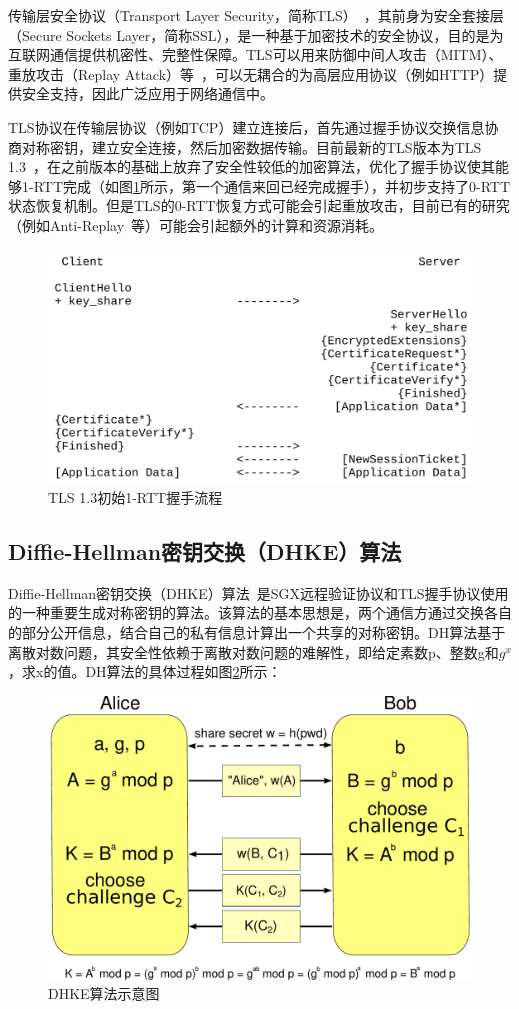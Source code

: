 传输层安全协议（Transport Layer Security，简称TLS）~\cite{8446}，其前身为安全套接层（Secure Sockets Layer，简称SSL），是一种基于加密技术的安全协议，目的是为互联网通信提供机密性、完整性保障。TLS可以用来防御中间人攻击（MITM）、重放攻击（Replay Attack）等~\cite{8446}，可以无耦合的为高层应用协议（例如HTTP）提供安全支持，因此广泛应用于网络通信中。

TLS协议在传输层协议（例如TCP）建立连接后，首先通过握手协议交换信息协商对称密钥，建立安全连接，然后加密数据传输。目前最新的TLS版本为TLS 1.3~\cite{8446}，在之前版本的基础上放弃了安全性较低的加密算法，优化了握手协议使其能够1-RTT完成（如图\ref{fig:1-rtt}所示，第一个通信来回已经完成握手），并初步支持了0-RTT状态恢复机制。但是TLS的0-RTT恢复方式可能会引起重放攻击，目前已有的研究（例如Anti-Replay~\cite{8446}等）可能会引起额外的计算和资源消耗。

\begin{figure}[!ht]
    \centering
    \includegraphics[width=.6\textwidth]{figures/1-RTT.png}
    \caption{TLS 1.3初始1-RTT握手流程}
    \label{fig:1-rtt}
\end{figure}

\subsection{Diffie-Hellman密钥交换（DHKE）算法}

Diffie-Hellman密钥交换（DHKE）算法~\cite{Diffie1976NewDI}是SGX远程验证协议和TLS握手协议使用的一种重要生成对称密钥的算法。该算法的基本思想是，两个通信方通过交换各自的部分公开信息，结合自己的私有信息计算出一个共享的对称密钥。DH算法基于离散对数问题，其安全性依赖于离散对数问题的难解性，即给定素数p、整数g和$g^x$，求x的值。DH算法的具体过程如图\ref{fig:dhke}所示：

\begin{figure}[!ht]
    \centering
    \includegraphics[width=.5\textwidth]{figures/DHKE.pdf}
    \caption{DHKE算法示意图}
    \label{fig:dhke}
\end{figure}


